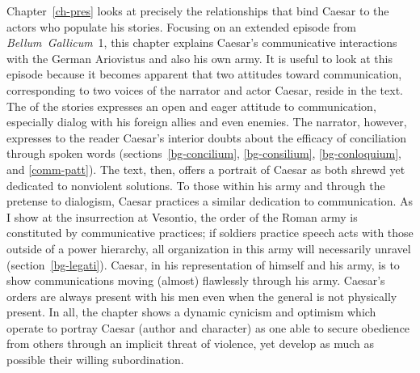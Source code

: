\documentclass[12pt,letterpaper,oneside,final]{memoir}
\begin{document}
Chapter~\ref{ch-pres} looks at precisely the relationships that bind Caesar to the actors who populate his stories. Focusing on an extended episode from \emph{Bellum~Gallicum}~1, this chapter explains Caesar's communicative interactions with the German Ariovistus and also his own army. It is useful to look at this episode because it becomes apparent that two attitudes toward communication, corresponding to two voices of the narrator and actor Caesar, reside in the text. The  of the stories expresses an open and eager attitude to communication, especially dialog with his foreign allies and even enemies. The narrator, however, expresses to the reader Caesar's interior doubts about the efficacy of conciliation through spoken words (sections~\ref{bg-concilium}, \ref{bg-consilium}, \ref{bg-conloquium}, and \ref{comm-patt}). The text, then, offers a portrait of Caesar as both shrewd yet dedicated to nonviolent solutions. To those within his army and through the pretense to dialogism, Caesar practices a similar dedication to communication. As I show at the insurrection at Vesontio, the order of the Roman army is constituted by communicative practices; if soldiers practice speech acts with those outside of a power hierarchy, all organization in this army will necessarily unravel (section~\ref{bg-legati}). Caesar, in his representation of himself and his army, is to show communications moving  (almost) flawlessly through his army. Caesar's orders are always present with his men even when the general is not physically present. In all, the chapter shows a dynamic cynicism and optimism which operate to portray Caesar (author and character) as one able to secure obedience from others through an implicit threat of violence, yet develop as much as possible their willing subordination.
\end{document}
